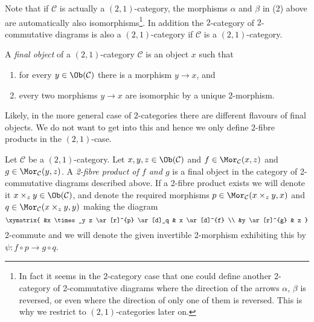 Note that if $\mathcal{C}$ is actually a $(2, 1)$-category,
the morphisms $\alpha$ and $\beta$ in (2) above are automatically
also isomorphisms\footnote{In fact it seems in the $2$-category case
that one could define another 2-category of 2-commutative diagrams where
the direction of the arrows $\alpha$, $\beta$ is reversed, or even
where the direction of only one of them is reversed. This is why
we restrict to $(2, 1)$-categories later on.}.
In addition the $2$-category of
$2$-commutative diagrams is also a $(2, 1)$-category if $\mathcal{C}$ is
a $(2, 1)$-category.

\begin{definition}
\label{definition-final-object-2-category}
A {\it final object} of a $(2, 1)$-category
$\mathcal{C}$ is an object $x$ such that
\begin{enumerate}
\item for every $y \in \Ob(\mathcal{C})$ there is a morphism $y \to x$,
and
\item every two morphisms $y \to x$ are isomorphic by a unique 2-morphism.
\end{enumerate}
\end{definition}

\noindent
Likely, in the more general case of $2$-categories there are different
flavours of final objects. We do not want to get into this and hence
we only define $2$-fibre products in the $(2, 1)$-case.

\begin{definition}
\label{definition-2-fibre-products}
Let $\mathcal{C}$ be a $(2, 1)$-category.
Let $x, y, z\in \Ob(\mathcal{C})$ and
$f\in \Mor_\mathcal{C}(x, z)$
and $g\in \Mor_{\mathcal C}(y, z)$. A
{\it 2-fibre product of $f$ and $g$} is
a final object in the category of 2-commutative diagrams
described above. If a 2-fibre product exists we
will denote it $x \times_z y\in \Ob(\mathcal{C})$, and denote the
required morphisms $p\in \Mor_{\mathcal C}(x \times_z y, x)$ and
$q\in \Mor_{\mathcal C}(x \times_z y, y)$ making the diagram
$$
\xymatrix{
&x \times_y z \ar[r]^{p} \ar[d]_q & x \ar[d]^{f} \\
&y \ar[r]^{g} & z }
$$
2-commute and we will denote the given invertible
2-morphism exhibiting this by $\psi : f \circ p \to g \circ q$.
\end{definition}


